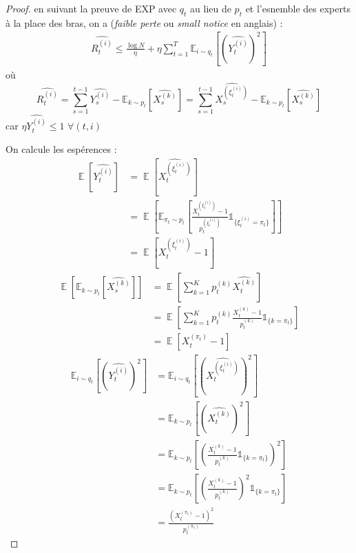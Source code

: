 \documentclass{article}
\DeclareMathOperator*{\E}{\mathbb{E}}
\theoremstyle{remark}
\theoremstyle{remark}
\begin{document}
\begin{proof}
   en suivant la preuve de EXP avec $q_t$ au lieu de $p_t$ et l'esnemble des experts à la place des bras, on a (\textit{faible perte} ou \textit{small notice} en anglais) :
   \begin{align}
      \widehat{R_t^{(i)}} \leq \frac{\log N}{\eta} + \eta \sum_{t=1}^T \mathbb{E}_{i \sim q_t} \left[\left(\widehat{Y_t^{(i)}}\right)^2\right]
      \label{eq:demo1}
   \end{align}
   où
   $$
   \widehat{R_t^{(i)}}
   = \sum_{s=1}^{t-1} \widehat{Y_s^{(i)}} - \mathbb{E}_{k \sim p_t} \left[ \widehat{X_s^{(k)}} \right]
   = \sum_{s=1}^{t-1} \widehat{X_s^{(\xi_t^{(i)})}} - \mathbb{E}_{k \sim p_t} \left[ \widehat{X_s^{(k)}} \right]
   $$
   car $\eta \widehat{Y_t^{(i)}} \leq 1 $ $\forall (t,i)$

   On calcule les espérences :
   \begin{align*}
      \E \left[\widehat{Y_t^{(i)}}\right]
      &= \E \left[\widehat{X_t^{(\xi_t^{(i)})}}\right] \\
      &= \E \left[\mathbb{E}_{\pi_t \sim p_t}\left[ \frac{X_t^{(\xi_t^{(i)})}-1}{p_t^{(\xi_t^{(i)})}} \mathbb{1}_{\{ \xi_t^{(i)} = \pi_t\}}\right]\right] \\
      &= \E\left[X_t^{(\xi_t^{(i)})} - 1\right]
   \end{align*}
   \begin{align*}
      \E \left[ \mathbb{E}_{k \sim p_t} \left[ \widehat{X_s^{(k)}} \right] \right]
      &= \E \left[\sum_{k=1}^K p_t^{(k)} \widehat{X_t^{(k)}}\right] \\
      &= \E \left[\sum_{k=1}^K p_t^{(k)} \frac{X_t^{(k)}-1}{p_t^{(k)}} \mathbb{1}_{\{ k = \pi_t\}} \right] \\
      &= \E \left[ X_t^{(\pi_t)} -1 \right]
   \end{align*}
   \begin{align*}
      \mathbb{E}_{i \sim q_t} \left[\left(\widehat{Y_t^{(i)}}\right)^2\right]
      &= \mathbb{E}_{i \sim q_t} \left[\left(\widehat{X_t^{(\xi_t^{(i)})}}\right)^2\right] \\
      &= \mathbb{E}_{k \sim p_t} \left[\left(\widehat{X_t^{(k)}}\right)^2\right] \\
      &= \mathbb{E}_{k \sim p_t} \left[\left( \frac{X_t^{(k)}-1}{p_t^{(k)}} \mathbb{1}_{\{ k = \pi_t\}} \right)^2  \right] \\
      &= \mathbb{E}_{k \sim p_t} \left[\left( \frac{X_t^{(k)}-1}{p_t^{(k)}} \right)^2  \mathbb{1}_{\{ k = \pi_t\}} \right] \\
      &= \frac{\left( X_t^{(\pi_t)} -1 \right)^2}{p_t^{(\pi_t)}}
   \end{align*}


\end{proof}
\end{document}
